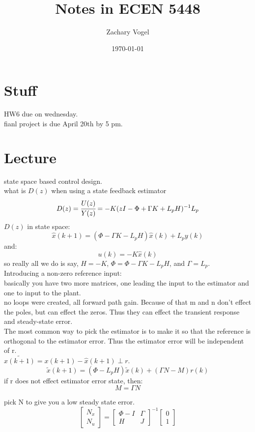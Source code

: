 \documentclass{article}
\author{Zachary Vogel}
\date{\today}
\title{Notes in ECEN 5448}
\begin{document}
\maketitle


\section*{Stuff}
HW6 due on wednesday.\\
fianl project is due April 20th by 5 pm.\\

\section*{Lecture}
state space based control design.\\
what is $D(z)$ when using a state feedback estimator\\
\[D(z)=\cfrac{U(z)}{Y(z)}=-K(zI-\Phi+\Gamma K+L_pH)^{-1}L_p\]
$D(z)$ in state space:
\[\hat{x}(k+1)=(\Phi-\Gamma K-L_pH)\hat{x}(k)+L_py(k)\]
and:
\[u(k)=-K\hat{x}(k)\]
so really all we do is say, $H=-K$, $\Phi=\Phi-\Gamma K-L_pH$, and $\Gamma=L_p$.\\

Introducing a non-zero reference input:\\
basically you have two more matrices, one leading the input to the estimator and one to input to the plant.\\
no loops were created, all forward path gain. Because of that m and n don't effect the poles, but can effect the zeros. Thus they can effect the transient response and steady-state error.\\

The most common way to pick the estimator is to make it so that the reference is orthogonal to the estimator error. Thus the estimator error will be independent of r.\\
$\tilde{x(k+1)}=x(k+1)-\hat{x}(k+1)\perp r$.\\
\[\tilde{x}(k+1)=(\Phi-L_pH)\tilde{x}(k)+(\Gamma N-M)r(k)\]
if r does not effect estimator error state, then:
\[M=\Gamma N\]

pick N to give you a low steady state error.\\
\[\begin{bmatrix}N_x\\N_u\end{bmatrix}=\begin{bmatrix}\Phi-I& \Gamma\\H&J\end{bmatrix}^{-1}\begin{bmatrix}0\\1\end{bmatrix}\]
\end{document}

